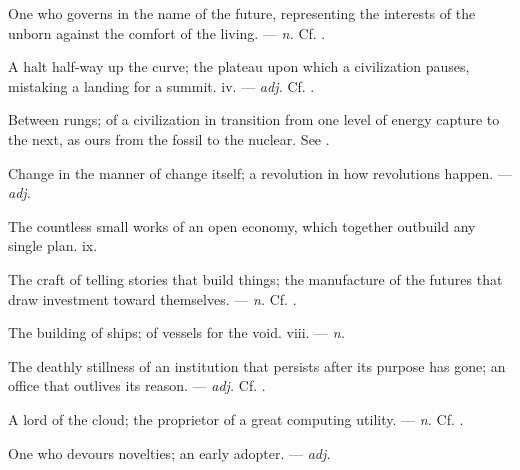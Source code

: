  One who governs in the name of the future, representing the interests of the unborn against the comfort of the living. ---  \textit{n.} Cf. .

 A halt half-way up the curve; the plateau upon which a civilization pauses, mistaking a landing for a summit.   iv. ---  \textit{adj.} Cf. .

 Between rungs; of a civilization in transition from one level of energy capture to the next, as ours from the fossil to the nuclear. See .

 Change in the manner of change itself; a revolution in how revolutions happen. ---  \textit{adj.}

 The countless small works of an open economy, which together outbuild any single plan.   ix.

 The craft of telling stories that build things; the manufacture of the futures that draw investment toward themselves. ---  \textit{n.} Cf. .

 The building of ships;  of vessels for the void.   viii. ---  \textit{n.}

 The deathly stillness of an institution that persists after its purpose has gone; an office that outlives its reason. ---  \textit{adj.} Cf. .

 A lord of the cloud; the proprietor of a great computing utility. ---  \textit{n.} Cf. .

 One who devours novelties; an early adopter.   ---  \textit{adj.}

